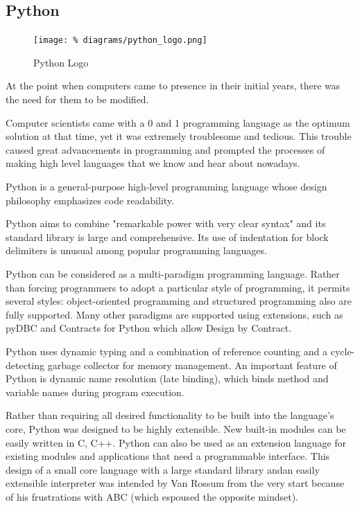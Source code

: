 \subsection{Python}

\begin{figure}[H]
  \centering
  \texttt{[image: \%
    diagrams/python\_logo.png]}
  \caption{Python Logo}
\end{figure}

At the point when computers came to presence in their
initial years, there was the need for them to be modified.

Computer scientists came with a 0 and 1 programming
language as the optimum solution at that time, yet it was
extremely troublesome and tedious. This trouble caused
great advancements in programming and prompted the
processes of making high level languages that we know and
hear about nowadays.

Python is a general-purpose high-level programming
language\cite{amjad1} whose design philosophy
emphasizes code readability.\cite{amjad2}

Python aims to combine "remarkable power with very clear
syntax"\cite{amjad3} and its standard library is large and
comprehensive. Its use of indentation for block delimiters
is unusual among popular programming languages.

Python can be considered as a multi-paradigm programming
language. Rather than forcing programmers to adopt a
particular style of programming, it permits several styles:
object-oriented programming and structured programming also
are fully supported. Many other paradigms are supported
using extensions, such as pyDBC\cite{amjad4} and Contracts
for Python\cite{amjad5} which allow Design by Contract.

Python uses dynamic typing and a combination of reference
counting and a cycle-detecting garbage collector for memory
management. An important feature of Python is dynamic name
resolution (late binding), which binds method and variable
names during program execution.

Rather than requiring all desired functionality to be built
into the language's core, Python was designed to be highly
extensible. New built-in modules can be easily written in
C, C++. Python can also be used as an extension language
for existing modules and applications that need a
programmable interface. This design of a small core
language with a large standard library andan easily
extensible interpreter was intended by Van Rossum from the
very start because of his frustrations with ABC (which
espoused the opposite mindset).\cite{amjad6}

